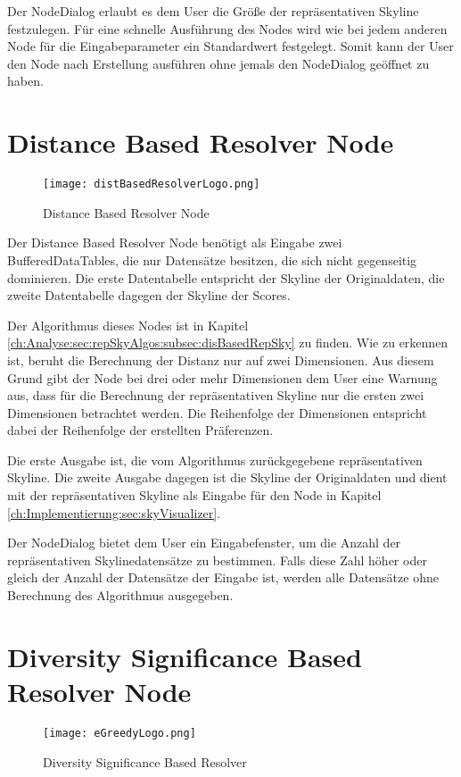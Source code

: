 Der NodeDialog erlaubt es dem User die Größe der repräsentativen Skyline festzulegen. Für eine schnelle Ausführung des Nodes wird wie bei jedem anderen Node für die Eingabeparameter ein Standardwert festgelegt. Somit kann der User den Node nach Erstellung ausführen ohne jemals den NodeDialog geöffnet zu haben.   
\section{Distance Based Resolver Node}
\label{ch:Implementierung:sec:distBasedResolverNode}
\begin{figure}[H]
	\centering
	\texttt{[image: distBasedResolverLogo.png]}
	\caption{Distance Based Resolver Node}
	\label{img:distBasedResolverLogo}
\end{figure}

Der Distance Based Resolver Node benötigt als Eingabe zwei BufferedDataTables, die nur Datensätze besitzen, die sich nicht gegenseitig dominieren. Die erste Datentabelle entspricht der Skyline der Originaldaten, die zweite Datentabelle dagegen der Skyline der Scores.

Der Algorithmus dieses Nodes ist in Kapitel \ref{ch:Analyse:sec:repSkyAlgos:subsec:disBasedRepSky} zu finden. Wie zu erkennen ist, beruht die Berechnung der Distanz nur auf zwei Dimensionen. Aus diesem Grund gibt der Node bei drei oder mehr Dimensionen dem User eine Warnung aus, dass für die Berechnung der repräsentativen Skyline nur die ersten zwei Dimensionen betrachtet werden. Die Reihenfolge der Dimensionen entspricht dabei der Reihenfolge der erstellten Präferenzen.

Die erste Ausgabe ist, die vom Algorithmus zurückgegebene repräsentativen Skyline. Die zweite Ausgabe dagegen ist die Skyline der Originaldaten und dient mit der repräsentativen Skyline als Eingabe für den Node in Kapitel \ref{ch:Implementierung:sec:skyVisualizer}.

Der NodeDialog bietet dem User ein Eingabefenster, um die Anzahl der repräsentativen Skylinedatensätze zu bestimmen. Falls diese Zahl höher oder gleich der Anzahl der Datensätze der Eingabe ist, werden alle Datensätze ohne Berechnung des Algorithmus ausgegeben.
\section{Diversity Significance Based Resolver Node}
\label{ch:Implementierung:sec:eGreedyNode}
\begin{figure}[H]
	\centering
	\texttt{[image: eGreedyLogo.png]}
	\caption{Diversity Significance Based Resolver}
	\label{img:eGreedyLogo}
\end{figure}


